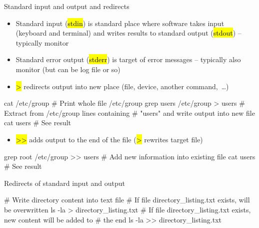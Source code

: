 \documentclass[compress, ucs, xelatex, 11pt, xcolor=svgnames,
  hyperref={
    bookmarks=true,
    unicode=true,
    colorlinks=true,
    pdftitle={Linux, command line and MetaCentrum},
    plainpages=false,
    pdfauthor={Vojtech Zeisek},
    pdfsubject={Course about use of Linux command line, writing shell scripts and using MetaCentrum of CESNET},
    pdfcreator={XeLaTeX},
    pdfkeywords={Linux, GNU, BASH, shell, command line, MetaCentrum},
    linkcolor=Red,
    anchorcolor=Blue,
    citecolor=Purple,
    filecolor=DodgerBlue,
    menucolor=DarkOrchid,
    urlcolor=DeepSkyBlue,
    pdftex},
  url={hyphens, lowtilde} %
  ]{beamer}
\renewcommand{\texttt}[1]{\hl{\ttfamily #1}}
\begin{document}
\begin{frame}[fragile]{Standard input and output and redirects}
\begin{itemize}
  \item Standard input (\texttt{stdin}) is standard place where software takes input (keyboard and terminal) and writes results to standard output (\texttt{stdout}) -- typically monitor
  \item Standard error output (\texttt{stderr}) is target of error messages -- typically also monitor (but can be log file or so)
  \item \alert{\texttt{\textgreater}} redirects output into new place (file, device, another command,~\ldots)
\end{itemize}
  \begin{bashcode}
    cat /etc/group # Print whole file /etc/group
    grep users /etc/group > users # Extract from /etc/group lines containing
                                  # "users" and write output into new file
    cat users # See result
  \end{bashcode}
\begin{itemize}
  \item \alert{\texttt{\textgreater\textgreater}} adds output to the end of the file (\texttt{\textgreater} rewrites target file)
\end{itemize}
  \begin{bashcode}
    grep root /etc/group >> users # Add new information into existing file
    cat users # See result
  \end{bashcode}
\end{frame}

\begin{frame}[fragile]{Redirects of standard input and output}
  \begin{bashcode}
    # Write directory content into text file
    # If file directory_listing.txt exists, will be overwritten
    ls -la > directory_listing.txt
    # If file directory_listing.txt exists, new content will be added to
    # the end
    ls -la >> directory_listing.txt
  \end{bashcode}
\end{frame}
\end{document}
